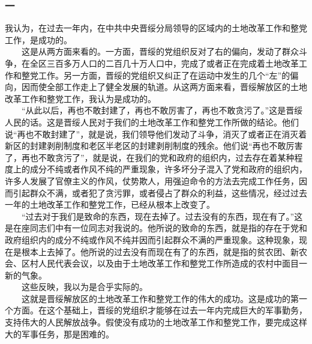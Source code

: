 \documentclass[cn,11pt,chinese]{elegantbook}
\def\myformat#1{\hfil\hfil #1}
\begin{document}
\subsubsection*{\myformat{一}}
我认为，在过去一年内，在中共中央晋绥分局领导的区域内的土地改革工作和整党工作，是成功的。\\
　　这是从两方面来看的。一方面，晋绥的党组织反对了右的偏向，发动了群众斗争，在全区三百多万人口的二百几十万人口中，完成了或者正在完成着土地改革工作和整党工作。另一方面，晋绥的党组织又纠正了在运动中发生的几个“左”的偏向，因而使全部工作走上了健全发展的轨道。从这两方面来看，晋绥解放区的土地改革工作和整党工作，我认为是成功的。\\
　　“从此以后，再也不敢封建了，再也不敢厉害了，再也不敢贪污了。”这是晋绥人民的话。这是晋绥人民对于我们的土地改革工作和整党工作所做的结论。他们说“再也不敢封建了”，就是说，我们领导他们发动了斗争，消灭了或者正在消灭着新区的封建剥削制度和老区半老区的封建剥削制度的残余。他们说“再也不敢厉害了，再也不敢贪污了”，就是说，在我们的党和政府的组织内，过去存在着某种程度上的成分不纯或者作风不纯的严重现象，许多坏分子混入了党和政府的组织内，许多人发展了官僚主义的作风，仗势欺人，用强迫命令的方法去完成工作任务，因而引起群众不满，或者犯了贪污罪，或者侵占了群众的利益，这些情况，经过过去一年的土地改革工作和整党工作，已经从根本上改变了。\\
　　“过去对于我们是致命的东西，现在去掉了。过去没有的东西，现在有了。”这是在座同志们中有一位同志对我说的。他所说的致命的东西，就是指的存在于党和政府组织内的成分不纯或作风不纯并因而引起群众不满的严重现象。这种现象，现在是根本上去掉了。他所说的过去没有而现在有了的东西，就是指的贫农团、新农会、区村人民代表会议，以及由于土地改革工作和整党工作所造成的农村中面目一新的气象。\\
　　这些反映，我以为是合乎实际的。\\
　　这就是晋绥解放区的土地改革工作和整党工作的伟大的成功。这是成功的第一个方面。在这个基础上，晋绥的党组织才能够在过去一年内完成巨大的军事勤务，支持伟大的人民解放战争。假使没有成功的土地改革工作和整党工作，要完成这样大的军事任务，那是困难的。\\
\end{document}
